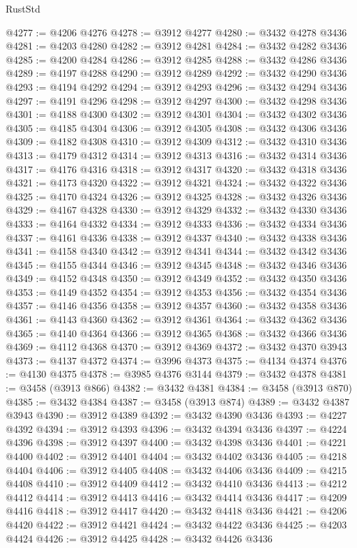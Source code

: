 \begin{lexlean}{RustStd}
\begin{coremodule}
@4277 := @4206 @4276
@4278 := @3912 @4277
@4280 := @3432 @4278 @3436
@4281 := @4203 @4280
@4282 := @3912 @4281
@4284 := @3432 @4282 @3436
@4285 := @4200 @4284
@4286 := @3912 @4285
@4288 := @3432 @4286 @3436
@4289 := @4197 @4288
@4290 := @3912 @4289
@4292 := @3432 @4290 @3436
@4293 := @4194 @4292
@4294 := @3912 @4293
@4296 := @3432 @4294 @3436
@4297 := @4191 @4296
@4298 := @3912 @4297
@4300 := @3432 @4298 @3436
@4301 := @4188 @4300
@4302 := @3912 @4301
@4304 := @3432 @4302 @3436
@4305 := @4185 @4304
@4306 := @3912 @4305
@4308 := @3432 @4306 @3436
@4309 := @4182 @4308
@4310 := @3912 @4309
@4312 := @3432 @4310 @3436
@4313 := @4179 @4312
@4314 := @3912 @4313
@4316 := @3432 @4314 @3436
@4317 := @4176 @4316
@4318 := @3912 @4317
@4320 := @3432 @4318 @3436
@4321 := @4173 @4320
@4322 := @3912 @4321
@4324 := @3432 @4322 @3436
@4325 := @4170 @4324
@4326 := @3912 @4325
@4328 := @3432 @4326 @3436
@4329 := @4167 @4328
@4330 := @3912 @4329
@4332 := @3432 @4330 @3436
@4333 := @4164 @4332
@4334 := @3912 @4333
@4336 := @3432 @4334 @3436
@4337 := @4161 @4336
@4338 := @3912 @4337
@4340 := @3432 @4338 @3436
@4341 := @4158 @4340
@4342 := @3912 @4341
@4344 := @3432 @4342 @3436
@4345 := @4155 @4344
@4346 := @3912 @4345
@4348 := @3432 @4346 @3436
@4349 := @4152 @4348
@4350 := @3912 @4349
@4352 := @3432 @4350 @3436
@4353 := @4149 @4352
@4354 := @3912 @4353
@4356 := @3432 @4354 @3436
@4357 := @4146 @4356
@4358 := @3912 @4357
@4360 := @3432 @4358 @3436
@4361 := @4143 @4360
@4362 := @3912 @4361
@4364 := @3432 @4362 @3436
@4365 := @4140 @4364
@4366 := @3912 @4365
@4368 := @3432 @4366 @3436
@4369 := @4112 @4368
@4370 := @3912 @4369
@4372 := @3432 @4370 @3943
@4373 := @4137 @4372
@4374 := @3996 @4373
@4375 := @4134 @4374
@4376 := @4130 @4375
@4378 := @3985 @4376 @3144
@4379 := @3432 @4378
@4381 := @3458 (@3913 @866)
@4382 := @3432 @4381
@4384 := @3458 (@3913 @870)
@4385 := @3432 @4384
@4387 := @3458 (@3913 @874)
@4389 := @3432 @4387 @3943
@4390 := @3912 @4389
@4392 := @3432 @4390 @3436
@4393 := @4227 @4392
@4394 := @3912 @4393
@4396 := @3432 @4394 @3436
@4397 := @4224 @4396
@4398 := @3912 @4397
@4400 := @3432 @4398 @3436
@4401 := @4221 @4400
@4402 := @3912 @4401
@4404 := @3432 @4402 @3436
@4405 := @4218 @4404
@4406 := @3912 @4405
@4408 := @3432 @4406 @3436
@4409 := @4215 @4408
@4410 := @3912 @4409
@4412 := @3432 @4410 @3436
@4413 := @4212 @4412
@4414 := @3912 @4413
@4416 := @3432 @4414 @3436
@4417 := @4209 @4416
@4418 := @3912 @4417
@4420 := @3432 @4418 @3436
@4421 := @4206 @4420
@4422 := @3912 @4421
@4424 := @3432 @4422 @3436
@4425 := @4203 @4424
@4426 := @3912 @4425
@4428 := @3432 @4426 @3436

\end{coremodule}
\end{lexlean}
